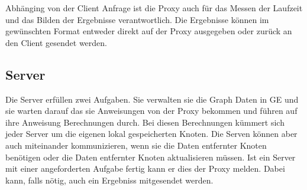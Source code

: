 Abhänging von der Client Anfrage ist die Proxy auch für das Messen der Laufzeit und das Bilden der Ergebnisse verantwortlich. Die Ergebnisse können im gewünschten Format entweder direkt auf der Proxy ausgegeben
oder zurück an den Client gesendet werden.

\subsection{Server}

Die Server erfüllen zwei Aufgaben. Sie verwalten sie die Graph Daten in GE und
sie warten darauf das sie Anweisungen von der Proxy bekommen und führen auf ihre Anweisung Berechnungen durch. Bei diesen Berechnungen kümmert sich jeder Server 
um die eigenen lokal gespeicherten Knoten. Die Serven können aber auch miteinander kommunizieren, wenn sie die Daten entfernter Knoten benötigen oder die Daten entfernter Knoten
aktualisieren müssen.
Ist ein Server mit einer angeforderten Aufgabe fertig kann er dies der Proxy melden. Dabei kann, falls nötig, auch ein Ergebniss mitgesendet werden.



